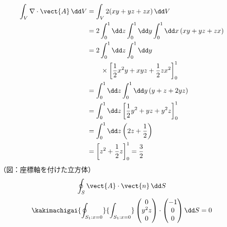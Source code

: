 \begin{align*}
\int_{V}\nabla\cdot\vect{A}\,\dd V&=\int_{V}2(xy+yz+zx)\,\dd V\\
&=2\int_{0}^{1}\dd z\int_{0}^{1}\dd y\int_{0}^{1}\dd x\,(xy+yz+zx)\\
&=2\int_{0}^{1}\dd z\int_{0}^{1}\dd y\\
&\qquad\times\left[\frac{1}{2}x^{2}y+xyz+\frac{1}{2}zx^{2}\right]_{0}^{1}\\
&=\int_{0}^{1}\dd z\int_{0}^{1}\dd y\,(y+z+2yz)\\
&=\int_{0}^{1}\dd z\left[\frac{1}{2}y^{2}+yz+y^{2}z\right]_{0}^{1}\\
&=\int_{0}^{1}\dd z\left(2z+\frac{1}{2}\right)\\
&=\left[z^{2}+\frac{1}{2}z\right]_{0}^{1}=\frac{3}{2}
\end{align*}
（図：座標軸を付けた立方体）
\[ \oint_{S}\vect{A}\cdot\vect{n}\,\dd S \]
\[ \kakimachigai{\oint_{S_{1}:x=0}}{\int_{S_{1}:x=0}}\begin{pmatrix}0\\y^{2}z\\0\end{pmatrix}\cdot\begin{pmatrix}-1\\0\\0\end{pmatrix}\dd S=0 \]
